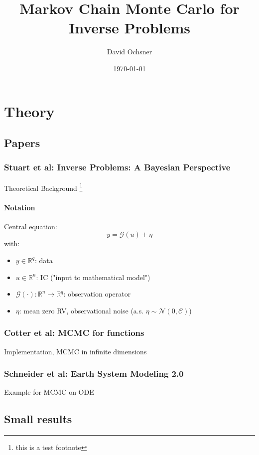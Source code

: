 \documentclass[11pt]{article}
\author{David Ochsner}
\date{\today}
\title{Markov Chain Monte Carlo for Inverse Problems}
\newcommand{\C}{{\mathcal{C}}}
\newcommand{\R}{{\mathbb{R}}}
\newcommand{\G}[1]{{\mathcal{G} \left( #1 \right)}}
\newcommand{\N}[2]{\mathcal{N}\left(#1,#2\right)}
\begin{document}
\maketitle
\tableofcontents


\section{Theory}
\label{sec:org010c7b4}
\subsection{Papers}
\label{sec:orgb03e070}
\subsubsection{Stuart et al: Inverse Problems: A Bayesian Perspective \cite{stuart_inverse_2010}}
\label{sec:org62d3a00}
Theoretical Background \footnote{this is a test footnote}

\paragraph{Notation}
\label{sec:orge3e969b}

Central equation:
$$y = \G{u} + \eta$$
with:
\begin{itemize}
\item \(y \in \R^q\): data
\item \(u \in \R^n\): IC ("input to mathematical model")
\item \(\G{\cdot} :\R^n \to \R^q\): observation operator
\item \(\eta\): mean zero RV, observational noise (a.s. \(\eta \sim \N{0}{\C}\))
\end{itemize}
\subsubsection{Cotter et al: MCMC for functions \cite{cotter_mcmc_2013}}
\label{sec:org1e8d743}
Implementation, MCMC in infinite dimensions
\subsubsection{Schneider et al: Earth System Modeling 2.0  \cite{schneider_earth_2017}}
\label{sec:orgce03e0f}
Example for MCMC on ODE
\subsection{Small results}
\label{sec:org8801cc9}
\end{document}
